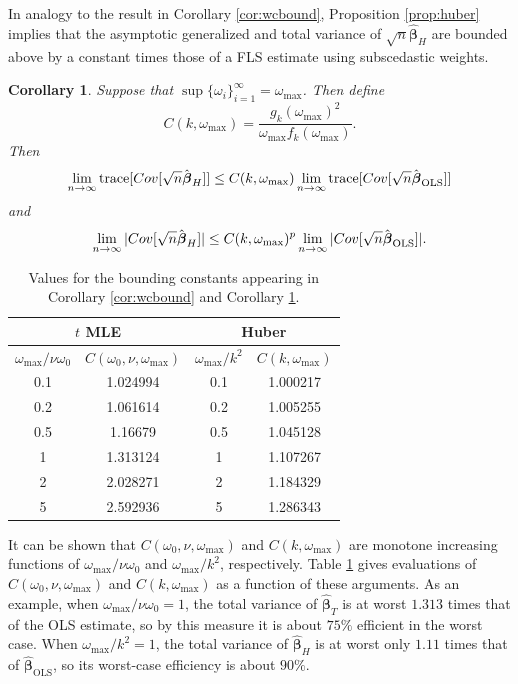 \documentclass[12pt]{article}
\newtheorem{corollary}{Corollary}
\newcommand{\Cov}[1]{{\rm{Cov}}[ #1 ]}
\newcommand{\tr}{\text{\rm trace}}
\newcommand{\bs}[1]{\boldsymbol #1}
\begin{document}
In analogy to the result in Corollary \ref{cor:wcbound}, Proposition \ref{prop:huber} implies that the asymptotic generalized and total variance of $\sqrt{n} \hat{\bs{\beta}}_{H}$ are bounded above by a constant times those of a FLS estimate using subscedastic weights.
\begin{corollary}\label{cor:wcboundh}
    Suppose that $\sup\{\omega_i\}_{i=1}^\infty = \omega_{\max}$. Then define
    \begin{equation*}
        C(k, \omega_\mathrm{max}) = \frac{g_{k}(\omega_{\max})^2}{\omega_{\max} f_{k}(\omega_{\max})}.
    \end{equation*}
    Then
    \begin{equation}\label{eq:limbd}
        \lim_{n \rightarrow \infty} \tr[\Cov{\sqrt{n} \hat{\bs{\beta}}_H}] \leq C(k, \omega_\mathrm{max}) \lim_{n \rightarrow \infty} \tr[\Cov{\sqrt{n} \hat{\bs{\beta}}_{\mathrm{OLS}}}]
    \end{equation}
    and
    \begin{equation}\label{eq:limbd}
        \lim_{n \rightarrow \infty} |\Cov{\sqrt{n} \hat{\bs{\beta}}_H}| \leq C(k, \omega_\mathrm{max})^p \lim_{n \rightarrow \infty} |\Cov{\sqrt{n} \hat{\bs{\beta}}_{\mathrm{OLS}}}|.
    \end{equation}
\end{corollary}

\begin{table}\centering
\begin{tabular}{@{}cc|cc@{}}\toprule
\multicolumn{2}{c}{$t$ MLE} & \multicolumn{2}{c}{Huber} \\ \midrule
$\omega_{\max}/\nu \omega_0$ & $C(\omega_0, \nu, \omega_{\max})$ & $\omega_{\max}/k^2$ & $C(k, \omega_{\max})$ \\ \midrule
0.1 & 1.024994 & 0.1 & 1.000217 \\
0.2 & 1.061614 & 0.2 & 1.005255 \\
0.5 & 1.16679 & 0.5 & 1.045128\\
1 & 1.313124 & 1 & 1.107267 \\
2 & 2.028271 & 2 & 1.184329 \\
5 & 2.592936 & 5 & 1.286343 \\
\bottomrule
\end{tabular}
\caption{Values for the bounding constants appearing in Corollary \ref{cor:wcbound} and Corollary \ref{cor:wcboundh}.}
\label{tab:consts}
\end{table}

It can be shown that $C(\omega_0, \nu, \omega_\mathrm{max})$ and $C(k, \omega_{\max})$ are monotone increasing functions of $\omega_{\max} / \nu \omega_0$ and $\omega_{\max} / k^2$, respectively. Table \ref{tab:consts} gives evaluations of $C(\omega_0, \nu, \omega_\mathrm{max})$ and $C(k, \omega_{\max})$ as a function of these arguments. As an example, when $\omega_{\max}/\nu \omega_0 = 1$, the total variance of $\hat{\bs{\beta}}_T$ is at worst $1.313$ times that of the OLS estimate, so by this measure it is about $75\%$ efficient in the worst case. When $\omega_{\max} / k^2 = 1$, the total variance of $\hat{\bs{\beta}}_H$ is at worst only $1.11$ times that of $\hat{\bs{\beta}}_{\mathrm{OLS}}$, so its worst-case efficiency is about $90 \%$.
\end{document}
